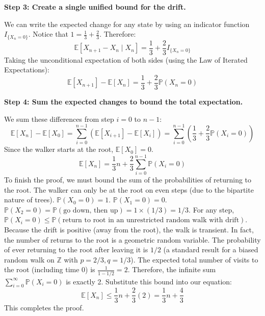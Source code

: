 \begin{solution}
\textbf{Step 3: Create a single unified bound for the drift.}

We can write the expected change for any state by using an indicator function $I_{\{X_n = 0\}}$.
Notice that $1 = \frac{1}{3} + \frac{2}{3}$. Therefore:
\[ \mathbb{E}[X_{n+1} - X_n \mid X_n] = \frac{1}{3} + \frac{2}{3} I_{\{X_n = 0\}} \]
Taking the unconditional expectation of both sides (using the Law of Iterated Expectations):
\[ \mathbb{E}[X_{n+1}] - \mathbb{E}[X_n] = \frac{1}{3} + \frac{2}{3} \mathbb{P}(X_n = 0) \]

\textbf{Step 4: Sum the expected changes to bound the total expectation.}

We sum these differences from step $i=0$ to $n-1$:
\[ \mathbb{E}[X_n] - \mathbb{E}[X_0] = \sum_{i=0}^{n-1} \left( \mathbb{E}[X_{i+1}] - \mathbb{E}[X_i] \right) = \sum_{i=0}^{n-1} \left( \frac{1}{3} + \frac{2}{3} \mathbb{P}(X_i = 0) \right) \]
Since the walker starts at the root, $\mathbb{E}[X_0] = 0$.
\[ \mathbb{E}[X_n] = \frac{1}{3}n + \frac{2}{3} \sum_{i=0}^{n-1} \mathbb{P}(X_i = 0) \]
To finish the proof, we must bound the sum of the probabilities of returning to the root.
The walker can only be at the root on even steps (due to the bipartite nature of trees).
$\mathbb{P}(X_0 = 0) = 1$.
$\mathbb{P}(X_1 = 0) = 0$.
$\mathbb{P}(X_2 = 0) = \mathbb{P}(\text{go down, then up}) = 1 \times (1/3) = 1/3$.
For any step, $\mathbb{P}(X_i = 0) \leq \mathbb{P}(\text{return to root in an unrestricted random walk with drift})$. Because the drift is positive (away from the root), the walk is transient.
In fact, the number of returns to the root is a geometric random variable. The probability of ever returning to the root after leaving it is $1/2$ (a standard result for a biased random walk on $\mathbb{Z}$ with $p=2/3, q=1/3$).
The expected total number of visits to the root (including time 0) is $\frac{1}{1 - 1/2} = 2$.
Therefore, the infinite sum $\sum_{i=0}^\infty \mathbb{P}(X_i = 0)$ is exactly 2.
Substitute this bound into our equation:
\[ \mathbb{E}[X_n] \leq \frac{1}{3}n + \frac{2}{3} (2) = \frac{1}{3}n + \frac{4}{3} \]
This completes the proof.
\end{solution}

